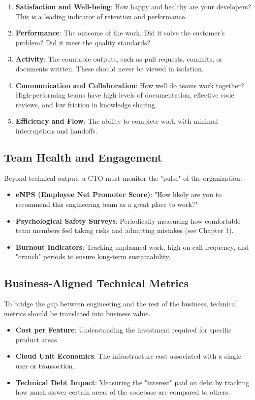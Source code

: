 \begin{enumerate}
    \item \textbf{Satisfaction and Well-being}: How happy and healthy are your developers? This is a leading indicator of retention and performance.
    \item \textbf{Performance}: The outcome of the work. Did it solve the customer's problem? Did it meet the quality standards?
    \item \textbf{Activity}: The countable outputs, such as pull requests, commits, or documents written. These should never be viewed in isolation.
    \item \textbf{Communication and Collaboration}: How well do teams work together? High-performing teams have high levels of documentation, effective code reviews, and low friction in knowledge sharing.
    \item \textbf{Efficiency and Flow}: The ability to complete work with minimal interruptions and handoffs.
\end{enumerate}


\subsection{Team Health and Engagement}
Beyond technical output, a CTO must monitor the "pulse" of the organization. 
\begin{itemize}
    \item \textbf{eNPS (Employee Net Promoter Score)}: "How likely are you to recommend this engineering team as a great place to work?"
    \item \textbf{Psychological Safety Surveys}: Periodically measuring how comfortable team members feel taking risks and admitting mistakes (see Chapter 1).
    \item \textbf{Burnout Indicators}: Tracking unplanned work, high on-call frequency, and "crunch" periods to ensure long-term sustainability.
\end{itemize}


\subsection{Business-Aligned Technical Metrics}
To bridge the gap between engineering and the rest of the business, technical metrics should be translated into business value.
\begin{itemize}
    \item \textbf{Cost per Feature}: Understanding the investment required for specific product areas.
    \item \textbf{Cloud Unit Economics}: The infrastructure cost associated with a single user or transaction.
    \item \textbf{Technical Debt Impact}: Measuring the "interest" paid on debt by tracking how much slower certain areas of the codebase are compared to others.
\end{itemize}


